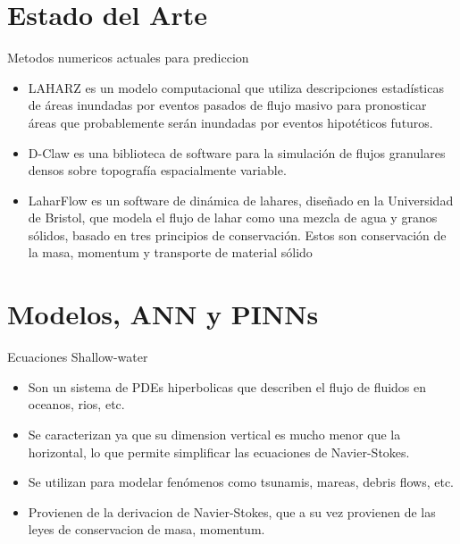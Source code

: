 \documentclass{beamer}
\begin{document}
\section{Estado del Arte}
\begin{frame}{Metodos numericos actuales para prediccion}
\begin{itemize}
    \item LAHARZ es un modelo computacional que utiliza descripciones estadísticas de áreas inundadas por eventos pasados de flujo masivo 
para pronosticar áreas que probablemente serán inundadas por eventos hipotéticos futuros. \cite{schilling2008using}
    \item D-Claw es una biblioteca de software para la simulación de flujos granulares densos sobre topografía espacialmente variable. \cite{george2025d}
    \item LaharFlow es un software de dinámica de lahares, diseñado en la Universidad de Bristol, que
modela el flujo de lahar como una mezcla de agua y granos sólidos, basado en tres principios
de conservación. Estos son conservación de la masa, momentum y transporte de material sólido \cite{woodhouseshallow}
\end{itemize}

\end{frame}


\section{Modelos, ANN y PINNs}
\begin{frame}{Ecuaciones Shallow-water}
\begin{itemize}
    \item Son un sistema de PDEs hiperbolicas que describen el flujo de fluidos en oceanos, rios, etc.
    \item Se caracterizan ya que su dimension vertical es mucho menor que la horizontal, lo que permite simplificar las ecuaciones de Navier-Stokes.
    \item Se utilizan para modelar fenómenos como tsunamis, mareas, debris flows, etc.
    \item Provienen de la derivacion de Navier-Stokes, que a su vez provienen de las leyes de conservacion de masa, momentum.
\end{itemize}
\end{frame}
\end{document}
